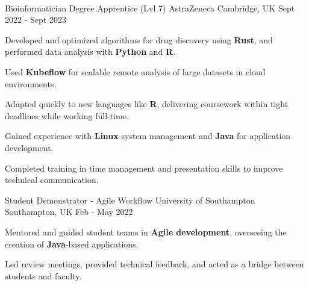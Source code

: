 \begin{cventries}
    \\[10pt]
    \cventry
    {Bioinformatician Degree Apprentice (Lvl 7)} %
    {AstraZeneca} %
    {Cambridge, UK} %
    {Sept 2022 - Sept 2023} %
    {
      \begin{cvitems}
        \item {Developed and optimized algorithms for drug discovery using \textbf{Rust}, and performed data analysis with \textbf{Python} and \textbf{R}.}
        \item {Used \textbf{Kubeflow} for scalable remote analysis of large datasets in cloud environments.}
        \item {Adapted quickly to new languages like \textbf{R}, delivering coursework within tight deadlines while working full-time.}
        \item {Gained experience with \textbf{Linux} system management and \textbf{Java} for application development.}
        \item {Completed training in time management and presentation skills to improve technical communication.}
      \end{cvitems}
    }
    \cventry
    {Student Demonstrator - Agile Workflow} %
    {University of Southampton} %
    {Southampton, UK} %
    {Feb - May 2022} %
    {
      \begin{cvitems}
        \item {Mentored and guided student teams in \textbf{Agile development}, overseeing the creation of \textbf{Java}-based applications.}
        \item {Led review meetings, provided technical feedback, and acted as a bridge between students and faculty.}
      \end{cvitems}
    }
\end{cventries}
